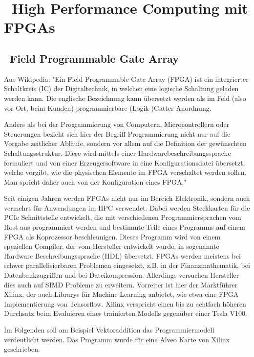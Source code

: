 	\chapter{~High Performance Computing mit FPGAs}
		\section{~Field Programmable Gate Array}
		Aus Wikipedia:
		"Ein Field Programmable Gate Array (FPGA) ist ein integrierter Schaltkreis (IC) der Digitaltechnik, in welchen eine logische Schaltung geladen werden kann. Die englische Bezeichnung kann übersetzt werden als im Feld (also vor Ort, beim Kunden) programmierbare (Logik-)Gatter-Anordnung.

		Anders als bei der Programmierung von Computern, Microcontrollern oder Steuerungen bezieht sich hier der Begriff Programmierung nicht nur auf die Vorgabe zeitlicher Abläufe, sondern vor allem auf die Definition der gewünschten Schaltungsstruktur. Diese wird mittels einer Hardwarebeschreibungssprache formuliert und von einer Erzeugersoftware in eine Konfigurationsdatei übersetzt, welche vorgibt, wie die physischen Elemente im FPGA verschaltet werden sollen. Man spricht daher auch von der Konfiguration eines FPGA."

		Seit einigen Jahren werden FPGAs nicht nur im Bereich Elektronik, sondern auch vermehrt für Anwendungen im HPC verwendet. Dabei werden Steckkarten für die PCIe Schnittstelle entwickelt, die mit verschiedenen Programmiersprachen vom Host aus programmiert werden und bestimmte Teile eines Programms auf einem FPGA als Koprozessor beschleunigen. Dieses Programm wird von einem speziellen Compiler, der vom Hersteller entwickelt wurde, in sogenannte Hardware Beschreibungssprache (HDL) übersetzt. FPGAs werden meistens bei schwer parallelisierbaren Problemen eingesetzt, z.B. in der Finanzmathematik, bei Datenbankzugriffen und bei Dateikompression. Allerdings versuchen Hersteller dies auch auf SIMD Probleme zu erweitern. Vorreiter ist hier der Marktführer Xilinx, der auch Librarys für Machine Learning anbietet, wie etwa eine FPGA Implementierung von Tensorflow. Xilinx verspricht einen bis zu achtfach höheren Durchsatz beim Evaluieren eines trainierten Modells gegenüber einer Tesla V100.
		
		Im Folgenden soll am Beispiel Vektoraddition das Programmiermodell verdeutlicht werden. Das Programm wurde für eine Alveo Karte von Xilinx geschrieben.

